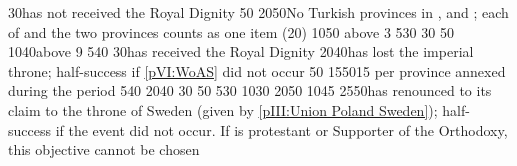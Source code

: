 {}{30}{\paysmajeurPrusse has not received the Royal Dignity}%
%
%
{}{50}{\EU@objSilesie}%
%
%
%
{20}{50}{No Turkish provinces in \payshongrie, \provinceBosna and
  \provinceSerbia; each of \payshongrie and the two provinces counts as one
  item (20\VPs)}%
%
%
{10}{50}{\EU@objEachProvinceOther{\paysNaples} above 3}%
%
%
{5}{30}{\EU@objAlliance}%
%
%
{}{30}{\EU@objFranceContained}%
%
%
{}{50}{\EU@objSilesie}%
%
 
%
%
{10}{40}{\EU@objEachProvince above 9}%
%
%
{5}{40}{\EU@objAlliance}%
%
%
{}{30}{\paysmajeurPrusse has received the Royal Dignity}%
%
%
{20}{40}{\paysmajeurAutriche has lost the imperial throne; half-success if
  \ref{pVI:WoAS} did not occur}%
%
%
{}{50}{\EU@objSilesie}%
%
%
%
{15}{50}{15 \VPs per province annexed during the period}%
%
%
{5}{40}{\EU@objAlliance}%
%
%
{20}{40}{\EU@objSYW}
%
%
{}{30}{\EU@objFranceContained}%
%
%
{}{50}{\EU@objSilesie}%
%
 
%
%
{5}{30}{\EU@objBaltiqueTrade}%
%
%
\EUobjective{}{\continentAmerica}{\COL/\TP}%
{10}{30}{}%
%
%
{20}{50}{}%
%
%
{10}{45}{}%
%
%
{25}{50}{\paysmajeurPologne has renounced to its claim to the throne of Sweden
  (given by \ref{pIII:Union Poland Sweden}); half-success if the event did not
  occur. If \paysmajeurPologne is protestant or Supporter of the Orthodoxy,
  this objective cannot be chosen}%
%
%
%
